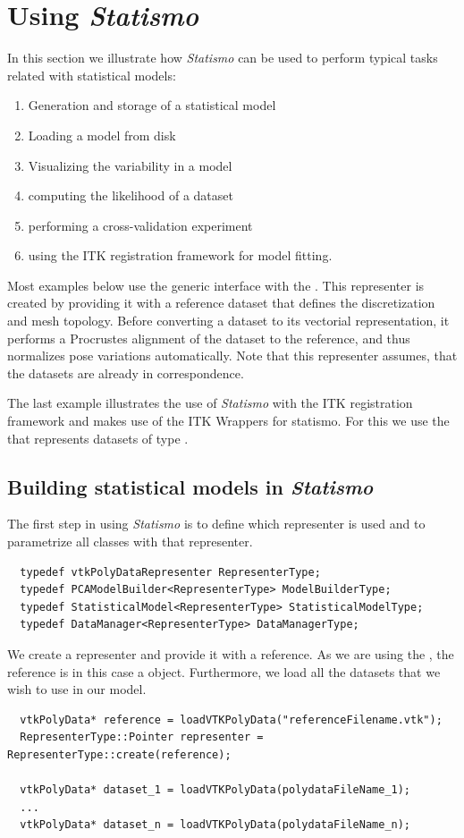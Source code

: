 \documentclass{InsightArticle}
\newcommand{\Statismo}{\emph{Statismo}\xspace}
\begin{document}
\section{Using \Statismo}
In this section we illustrate how \Statismo can be used to perform typical tasks related with statistical models:
\begin{enumerate}
  \item Generation and storage of a statistical model
  \item Loading a model from disk
  \item Visualizing the variability in  a model
  \item computing the likelihood of a dataset
  \item performing a cross-validation experiment
  \item using the ITK registration framework for model fitting. 
\end{enumerate}
Most examples below use  the generic
interface with the . This representer is
created by providing it with a reference dataset that defines the
discretization and mesh topology. Before converting a dataset to its
vectorial representation, it performs a Procrustes alignment
\cite{horn_closed-form_1987} of the dataset to the reference, and thus normalizes pose
variations automatically. Note that this representer assumes, that the
datasets are already in correspondence.

The last example illustrates the use of \Statismo with the ITK
registration framework and makes use of the ITK Wrappers for
statismo. For this we use the  that represents datasets
of type . 


\subsection{Building statistical models in \Statismo}

The first step in using \Statismo is to define which representer is used and to parametrize all classes with that 
representer. 
\begin{verbatim}
  typedef vtkPolyDataRepresenter RepresenterType;
  typedef PCAModelBuilder<RepresenterType> ModelBuilderType;
  typedef StatisticalModel<RepresenterType> StatisticalModelType;
  typedef DataManager<RepresenterType> DataManagerType;
\end{verbatim}

We create a representer and provide it with a reference. As we are
using the , the reference is in this case
a  object.
Furthermore, we load all the datasets that we wish to use in our model.
\begin{verbatim}
  vtkPolyData* reference = loadVTKPolyData("referenceFilename.vtk");
  RepresenterType::Pointer representer = RepresenterType::create(reference);

  vtkPolyData* dataset_1 = loadVTKPolyData(polydataFileName_1);
  ... 
  vtkPolyData* dataset_n = loadVTKPolyData(polydataFileName_n);
\end{verbatim}
\end{document}
